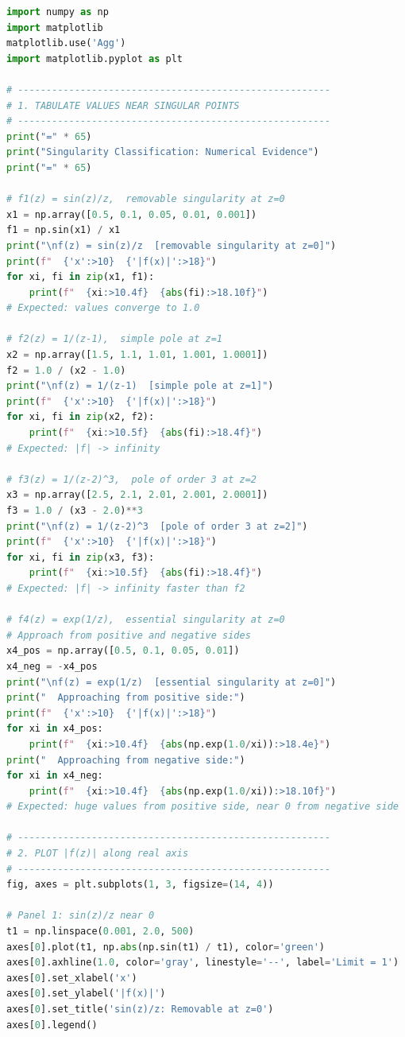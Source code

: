 \documentclass[12pt,a4paper]{article}
\begin{document}
\begin{lstlisting}[language=Python]
import numpy as np
import matplotlib
matplotlib.use('Agg')
import matplotlib.pyplot as plt

# -------------------------------------------------------
# 1. TABULATE VALUES NEAR SINGULAR POINTS
# -------------------------------------------------------
print("=" * 65)
print("Singularity Classification: Numerical Evidence")
print("=" * 65)

# f1(z) = sin(z)/z,  removable singularity at z=0
x1 = np.array([0.5, 0.1, 0.05, 0.01, 0.001])
f1 = np.sin(x1) / x1
print("\nf(z) = sin(z)/z  [removable singularity at z=0]")
print(f"  {'x':>10}  {'|f(x)|':>18}")
for xi, fi in zip(x1, f1):
    print(f"  {xi:>10.4f}  {abs(fi):>18.10f}")
# Expected: values converge to 1.0

# f2(z) = 1/(z-1),  simple pole at z=1
x2 = np.array([1.5, 1.1, 1.01, 1.001, 1.0001])
f2 = 1.0 / (x2 - 1.0)
print("\nf(z) = 1/(z-1)  [simple pole at z=1]")
print(f"  {'x':>10}  {'|f(x)|':>18}")
for xi, fi in zip(x2, f2):
    print(f"  {xi:>10.5f}  {abs(fi):>18.4f}")
# Expected: |f| -> infinity

# f3(z) = 1/(z-2)^3,  pole of order 3 at z=2
x3 = np.array([2.5, 2.1, 2.01, 2.001, 2.0001])
f3 = 1.0 / (x3 - 2.0)**3
print("\nf(z) = 1/(z-2)^3  [pole of order 3 at z=2]")
print(f"  {'x':>10}  {'|f(x)|':>18}")
for xi, fi in zip(x3, f3):
    print(f"  {xi:>10.5f}  {abs(fi):>18.4f}")
# Expected: |f| -> infinity faster than f2

# f4(z) = exp(1/z),  essential singularity at z=0
# Approach from positive and negative sides
x4_pos = np.array([0.5, 0.1, 0.05, 0.01])
x4_neg = -x4_pos
print("\nf(z) = exp(1/z)  [essential singularity at z=0]")
print("  Approaching from positive side:")
print(f"  {'x':>10}  {'|f(x)|':>18}")
for xi in x4_pos:
    print(f"  {xi:>10.4f}  {abs(np.exp(1.0/xi)):>18.4e}")
print("  Approaching from negative side:")
for xi in x4_neg:
    print(f"  {xi:>10.4f}  {abs(np.exp(1.0/xi)):>18.10f}")
# Expected: huge values from positive side, near 0 from negative side

# -------------------------------------------------------
# 2. PLOT |f(z)| along real axis
# -------------------------------------------------------
fig, axes = plt.subplots(1, 3, figsize=(14, 4))

# Panel 1: sin(z)/z near 0
t1 = np.linspace(0.001, 2.0, 500)
axes[0].plot(t1, np.abs(np.sin(t1) / t1), color='green')
axes[0].axhline(1.0, color='gray', linestyle='--', label='Limit = 1')
axes[0].set_xlabel('x')
axes[0].set_ylabel('|f(x)|')
axes[0].set_title('sin(z)/z: Removable at z=0')
axes[0].legend()


\end{lstlisting}
\end{document}
